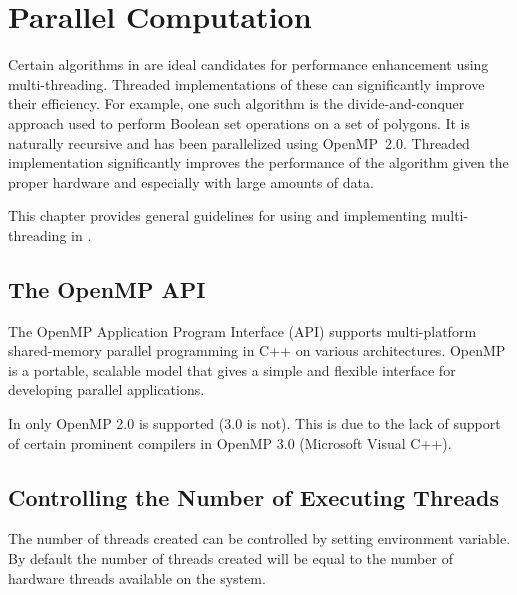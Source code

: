 
\chapter{Parallel Computation\label{chap:parallel_computation}}

Certain algorithms in \cgal{} are ideal candidates for performance
enhancement using multi-threading. Threaded implementations of these
can significantly improve their efficiency.
For example, one such algorithm is the divide-and-conquer approach
used to perform Boolean set operations on a set of polygons. It is
naturally recursive and has been parallelized using
OpenMP~2.0. Threaded implementation significantly improves the performance
of the algorithm given the proper hardware and especially with large
amounts of data.

This chapter provides general guidelines for using and implementing
multi-threading in \cgal{}.

\section{The OpenMP API\label{sec:openmp}}
The OpenMP Application Program Interface (API) supports multi-platform
shared-memory parallel programming in C++ on various
architectures. OpenMP is a portable, scalable model that gives a
simple and flexible interface for developing parallel applications.

In \cgal{} only OpenMP 2.0 is supported (3.0 is not). This is due to
the lack of support of certain prominent compilers in OpenMP 3.0
(Microsoft Visual C++).

\section{Controlling the Number of Executing Threads\label{sec:set_num_thread}}
The number of threads created can be controlled by setting
 environment variable. By default the number of
threads created will be equal to the number of hardware threads
available on the system.

